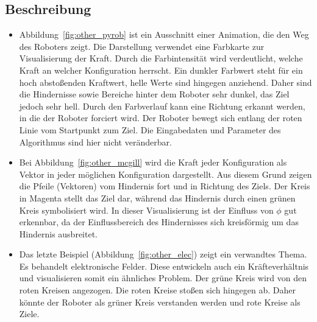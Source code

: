 \subsection{Beschreibung}
\begin{itemize}
\item Abbildung~\vref{fig:other_pyrob}  ist ein Ausschnitt einer Animation, die den Weg des Roboters zeigt. Die Darstellung verwendet eine Farbkarte zur Visualisierung der Kraft. Durch die Farbintensität wird verdeutlicht, welche Kraft an welcher Konfiguration herrscht. Ein dunkler Farbwert steht für ein hoch abstoßenden Kraftwert, helle Werte sind hingegen anziehend. Daher sind die Hindernisse sowie Bereiche hinter dem Roboter sehr dunkel, das Ziel jedoch sehr hell. Durch den Farbverlauf kann eine Richtung erkannt werden, in die der Roboter forciert wird. Der Roboter bewegt sich entlang der roten Linie vom Startpunkt zum Ziel. Die Eingabedaten und Parameter des Algorithmus sind hier nicht veränderbar.
\item Bei Abbildung~\vref{fig:other_mcgill} wird die Kraft jeder Konfiguration als Vektor in jeder möglichen Konfiguration dargestellt. Aus diesem Grund zeigen die Pfeile (Vektoren) vom Hindernis fort und in Richtung des Ziels. Der Kreis in Magenta stellt das Ziel dar, während das Hindernis durch einen grünen Kreis symbolisiert wird. In dieser Visualisierung ist der Einfluss von $\phi$ gut erkennbar, da der Einflussbereich des Hindernisses sich kreisförmig um das Hindernis ausbreitet.
\item Das letzte Beispiel (Abbildung~\vref{fig:other_elec}) zeigt ein verwandtes Thema. Es behandelt elektronische Felder. Diese entwickeln auch ein Kräfteverhältnis und visualisieren somit ein ähnliches Problem. Der grüne Kreis wird von den roten Kreisen angezogen. Die roten Kreise stoßen sich hingegen ab. Daher könnte der Roboter als grüner Kreis verstanden werden und rote Kreise als Ziele.
\end{itemize}

